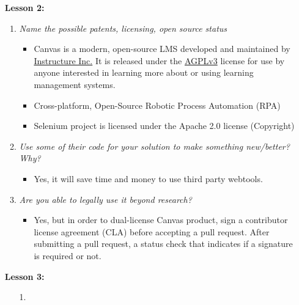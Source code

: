 \begin{itemize}
  \item[] \textbf{\large Lesson 2:}
  \begin{enumerate}
    \item \textsl{Name the possible patents, licensing, open source status}
    \begin{itemize}
      \item Canvas is a modern, open-source LMS developed and maintained by 
      \href{https://www.instructure.com/canvas/?newhome=canvas}{Instructure Inc.} 
      It is released under the \href{http://www.gnu.org/licenses/agpl-3.0.html}{AGPLv3} 
      license for use by anyone interested in learning more about or using learning 
      management systems.
      \item Cross-platform, Open-Source Robotic Process Automation (RPA)
      \item Selenium project is licensed under the Apache 2.0 license (Copyright)
    \end{itemize}
    \item \textsl{Use some of their code for your solution to make something new/better? Why?}
    \begin{itemize}
      \item Yes, it will save time and money to use third party webtools.
    \end{itemize}
    \item \textsl{Are you able to legally use it beyond research?}
    \begin{itemize}
      \item Yes, but in order to dual-license Canvas product, sign a contributor 
      license agreement (CLA) before accepting a pull request. After submitting 
      a pull request, a status check that indicates if a signature is required 
      or not.
    \end{itemize}
  \end{enumerate} 
\end{itemize}
\textbf{}
\begin{itemize}
  \item[] \textbf{\large Lesson 3:}
  \begin{enumerate}
    \item[1.] 
  \end{enumerate}   
\end{itemize}
